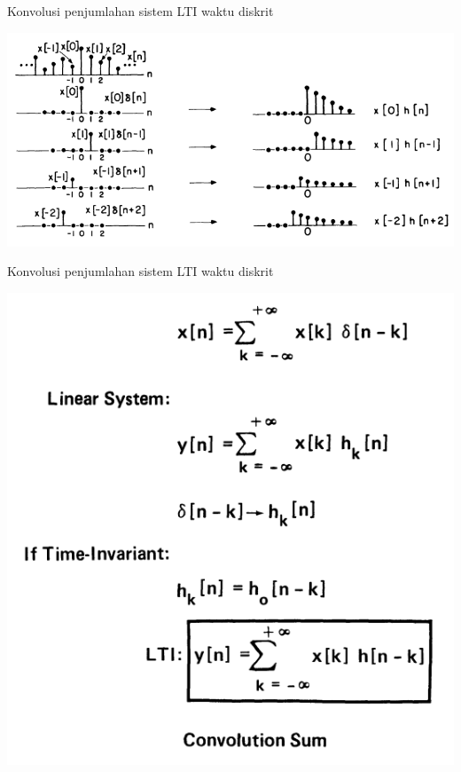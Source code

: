 \documentclass[aspectratio=169]{beamer}
\begin{document}
\begin{frame}{Konvolusi penjumlahan sistem LTI waktu diskrit}
	\begin{center}
		\includegraphics[width=\linewidth]{gambar/03.konvolusi/fig.4.02}
	\end{center}
\end{frame}

\begin{frame}{Konvolusi penjumlahan sistem LTI waktu diskrit}
	\begin{center}
		\includegraphics[height=0.8\textheight]{gambar/03.konvolusi/fig.4.03}
	\end{center}
\end{frame}
\end{document}
